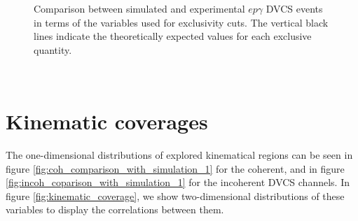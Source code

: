 \begin{figure}[h!]
\caption{Comparison between simulated and experimental $ep\gamma$ DVCS events 
in terms of the variables used for exclusivity cuts. The vertical black lines 
indicate the theoretically expected values for each exclusive quantity.} 
\label{fig:incoh_comparison_with_simulation_exclusive_2}
\end{figure}

~\newpage
~\newpage
\section{Kinematic coverages}
The one-dimensional distributions of explored kinematical regions can be 
seen in figure \ref{fig:coh_comparison_with_simulation_1} for the coherent, and 
in figure \ref{fig:incoh_coparison_with_simulation_1} for the incoherent DVCS 
channels. In figure \ref{fig:kinematic_coverage}, we show two-dimensional 
distributions of these variables to display the correlations between them. 

